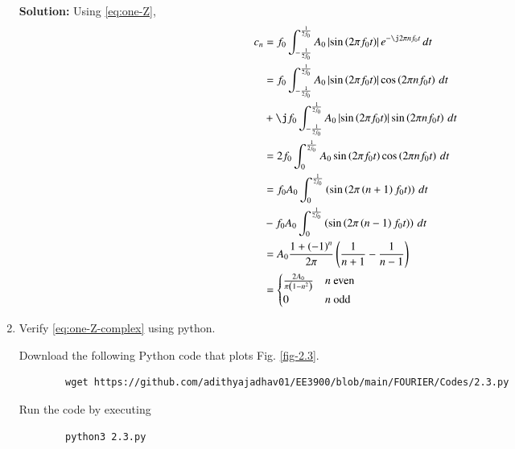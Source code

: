 \documentclass[journal,12pt,twocolumn]{IEEEtran}
\newcommand{\solution}{\noindent \textbf{Solution: }}
\providecommand{\brak}[1]{\ensuremath{\left(#1\right)}}
\providecommand{\abs}[1]{\left\vert#1\right\vert}
\numberwithin{equation}{section}
\numberwithin{figure}{section}
\renewcommand\thesection{\arabic{section}}
\begin{document}
\begin{enumerate}[label=\thesection.\arabic*,ref=\thesection.\theenumi]
\solution Using \eqref{eq:one-Z},
\begin{align}
    c_n &= f_0\int_{-\frac{1}{2f_0}}^{\frac{1}{2f_0}}A_0\abs{\sin\brak{2\pi f_0t}}
    e^{-\j2\pi nf_0t}\, dt \\
        &= f_0\int_{-\frac{1}{2f_0}}^{\frac{1}{2f_0}}A_0\abs{\sin\brak{2\pi f_0t}}
    \cos\brak{2\pi nf_0t}\, dt \nonumber \\
        &+ \j f_0\int_{-\frac{1}{2f_0}}^{\frac{1}{2f_0}}A_0
        \abs{\sin\brak{2\pi f_0t}}\sin\brak{2\pi nf_0t}\, dt \\
        &= 2f_0\int_{0}^{\frac{1}{2f_0}}A_0\sin\brak{2\pi f_0t}\cos\brak{2\pi nf_0t}\, dt \\
        &= f_0A_0\int_{0}^{\frac{1}{2f_0}}\brak{\sin\brak{2\pi\brak{n+1}f_0t}}\, dt \nonumber \\ 
        &- f_0A_0\int_{0}^{\frac{1}{2f_0}}\brak{\sin\brak{2\pi\brak{n-1}f_0t}}\, dt \\ 
        &= A_0\frac{1+\brak{-1}^n}{2\pi}\brak{\frac{1}{n+1} - \frac{1}{n-1}} \\
        &= 
        \begin{cases}
            \frac{2A_0}{\pi\brak{1-n^2}} & n\ \text{even} \\
            0 & n\ \text{odd}
        \end{cases}
        \label{eq:ck-xt}
\end{align}

\item Verify \eqref{eq:one-Z-complex} using python.

Download the following Python code that plots Fig. \ref{fig-2.3}.
	\begin{lstlisting}
		wget https://github.com/adithyajadhav01/EE3900/blob/main/FOURIER/Codes/2.3.py
	\end{lstlisting}
	
	Run the code by executing
	\begin{lstlisting}
		python3 2.3.py
	\end{lstlisting}


\end{enumerate}
\end{document}
